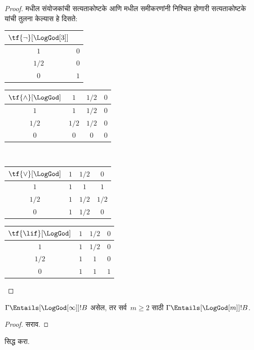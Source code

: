 \documentclass[../../../include/open-logic-section]{subfiles}
\begin{document}
\begin{proof}
   मधील संयोजकांची
  सत्यताकोष्टके आणि  मधील
  समीकरणांनी निश्चित होणारी सत्यताकोष्टके यांची तुलना
  केल्यास हे दिसते:
  \begin{center}
    \begin{tabular}{c|c}
      $\tf{\lnot}[\LogGod[3]]$ & \\
      \hline
      $1$ & $0$ \\
      $1/2$ & $0$ \\
      $0$ & $1$
    \end{tabular}
    \quad
    \begin{tabular}{c|ccc}
      $\tf{\land}[\LogGod]$ & $1$ & $1/2$ & $0$ \\
      \hline
      $1$ & $1$ & $1/2$ & $0$ \\
      $1/2$ & $1/2$ & $1/2$ & $0$\\
      $0$ & $0$ & $0$ & $0$
    \end{tabular}
    \\[2ex]
    \begin{tabular}{c|ccc}
      $\tf{\lor}[\LogGod]$ & $1$ & $1/2$ & $0$ \\
      \hline
      $1$ & $1$ & $1$ & $1$ \\
      $1/2$ & $1$ & $1/2$ & $1/2$ \\
      $0$ & $1$ & $1/2$ & $0$
    \end{tabular}
    \quad
    \begin{tabular}{c|ccc}
      $\tf{\lif}[\LogGod]$ & $1$ & $1/2$ & $0$ \\
      \hline
      $1$ & $1$ & $1/2$ & $0$ \\
      $1/2$ & $1$ & $1$ & $0$  \\
      $0$ & $1$ & $1$ & $1$
    \end{tabular}
  \end{center}
\end{proof}

\begin{prop}
  $\Gamma \Entails[\LogGod[\infty]] !B$ असेल, तर
  सर्व~$m \ge 2$ साठी $\Gamma \Entails[\LogGod[m]] !B$.
\end{prop}

\begin{proof}
  सराव.
\end{proof}

\begin{prob}
   सिद्ध करा.
\end{prob}
\end{document}
